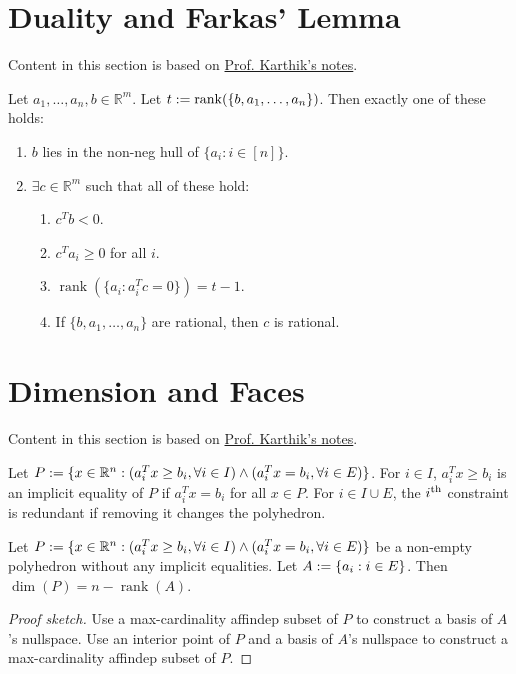 \documentclass[a4paper, 12pt, fleqn]{article}
\newenvironment*{tightenum}{\begin{enumerate}[noitemsep]}{\end{enumerate}}
\DeclareMathOperator{\rank}{rank}
\newcommand*{\karthikLecSeven}{http://karthik.ise.illinois.edu/courses/ie511/lectures-sp-21/lecture-7.pdf}
\begin{document}
\section{Duality and Farkas' Lemma}

Content in this section is based on \href{\karthikLecSeven}{Prof. Karthik's notes}.

\begin{theorem}
Let $a_1, \ldots, a_n, b \in \mathbb{R}^m$. Let $t \defeq \rank(\{b, a_1, \ldots, a_n\})$.
Then exactly one of these holds:
\begin{tightenum}
\item $b$ lies in the non-neg hull of $\{a_i: i \in [n]\}$.
\item $\exists c \in \mathbb{R}^m$ such that all of these hold:
    \begin{tightenum}
    \item $c^Tb < 0$.
    \item $c^Ta_i \ge 0$ for all $i$.
    \item $\rank(\{a_i: a_i^Tc = 0\}) = t-1$.
    \item If $\{b, a_1, \ldots, a_n\}$ are rational, then $c$ is rational.
    \end{tightenum}
\end{tightenum}
\end{theorem}

\section{Dimension and Faces}

Content in this section is based on \href{\karthikLecSeven}{Prof. Karthik's notes}.

\begin{definition}
Let $P := \{x \in \mathbb{R}^n: (a_i^Tx \ge b_i, \forall i \in I) \wedge (a_i^Tx = b_i, \forall i \in E)\}$.
For $i \in I$, $a_i^Tx \ge b_i$ is an implicit equality of $P$ if $a_i^Tx = b_i$ for all $x \in P$.
For $i \in I \cup E$, the $i^{\textrm{th}}$ constraint is redundant if removing it changes the polyhedron.
\end{definition}

\begin{theorem}
\label{thm:dim-from-rank}
Let $P := \{x \in \mathbb{R}^n: (a_i^Tx \ge b_i, \forall i \in I) \wedge (a_i^Tx = b_i, \forall i \in E)\}$
be a non-empty polyhedron without any implicit equalities.
Let $A := \{a_i: i \in E\}$. Then $\dim(P) = n - \rank(A)$.
\end{theorem}
\begin{proof}[Proof sketch]
Use a max-cardinality affindep subset of $P$ to construct a basis of $A$'s nullspace.
Use an interior point of $P$ and a basis of $A$'s nullspace to construct
a max-cardinality affindep subset of $P$.
\end{proof}
\end{document}

